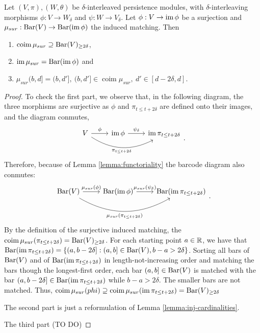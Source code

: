 \begin{lemma}
    Let $ (V, \pi), (W, \theta) $ be $\delta$-interleaved persistence modules, with $\delta$-interleaving morphisms $ \phi: V \to W_\delta $ and $ \psi: W \to V_\delta $. Let $ \phi: V \to \operatorname{im}\phi $ be a surjection and $ \mu_{sur}: \operatorname{Bar}(V) \to \operatorname{Bar} (\operatorname{im} \phi)$ the induced matching. Then
    \begin{enumerate}
        \item $\operatorname{coim} \mu_{sur} \supseteq \operatorname{Bar} (V)_{\geq 2\delta} $,
        \item $ \operatorname{im} \mu_{sur} = \operatorname{Bar} (\operatorname{im} \phi)$ and \label{}
        \item $ \mu_{sur}(b, d] = (b, d'], \ (b, d'] \in \operatorname{coim} \mu_{sur}, \ d' \in [d-2\delta, d]$.
    \end{enumerate}
\end{lemma}
\begin{proof}
    To check the first part, we observe that, in the following diagram, the three morphisms are surjective as $\phi$ and $\pi_{t \leq t+2\delta}$ are defined onto their images, and the diagram conmutes,
    $$
    \begin{tikzcd}
        V \arrow[r, "\phi"] \arrow[rr, "\pi_{t \leq t+2\delta}"', bend right] 
        & \im \phi \arrow[r, "\psi_\delta"] 
        & \im \pi_{t \leq t+2\delta} \\
    \end{tikzcd}.
    $$
    Therefore, because of Lemma \ref{lemma:functoriality} the barcode diagram also conmutes:
    $$
    \begin{tikzcd}
        \barc(V) \arrow[r, "\mu_{sur}(\phi)"] \arrow[rr, "\mu_{sur}(\pi_{t \leq t+2\delta})"', bend right] 
        & \barc(\im \phi) \arrow[r, "\mu_{sur}({\psi_\delta})"] 
        & \barc(\im \pi_{t \leq t+2\delta}) \\
    \end{tikzcd}.
    $$
    By the definition of the surjective induced matching, the $ \operatorname{coim} \mu_{sur}(\pi_{t \leq t+2\delta}) = \operatorname{Bar}(V)_{\geq 2\delta}$. For each starting point $ a \in \mathbb R $, we have that $\operatorname{Bar}(\operatorname{im} \pi_{t \leq t+2\delta}) = \{ (a, b-2\delta] : (a, b]\in \operatorname{Bar}(V), b-a > 2\delta\}$. Sorting all bars of $\operatorname{Bar}(V) $ and of $\operatorname{Bar}(\operatorname{im} \pi_{t \leq t+2\delta}) $ in length-not-increasing order and matching the bars though the longest-first order, each bar $ (a, b] \in \operatorname{Bar}(V) $ is matched with the bar $ (a, b - 2\delta] \in \operatorname{Bar}(\operatorname{im} \pi_{t \leq t+2\delta}) $ while $ b -a >2 \delta $. The smaller bars are not matched. Thus, $\operatorname{coim} \mu_{sur}(phi) \supseteq \operatorname{coim} \mu_{sur}(\operatorname{im} \pi_{t \leq t+2\delta}) = \operatorname{Bar} (V)_{\geq 2\delta} $

    The second part is just a reformulation of Lemma \ref{lemma:inj-cardinalities}.

    The third part (TO DO)
\end{proof}

